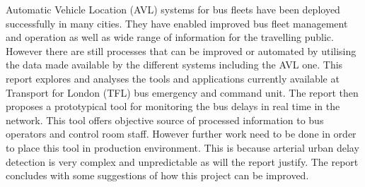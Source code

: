 Automatic Vehicle Location (AVL) systems for bus fleets have been deployed successfully in many cities. They have enabled improved bus fleet management and operation as well as wide range of information for the travelling public. However there are still processes that can be improved or automated by utilising the data made available by the different systems including the AVL one. This report explores and analyses the tools and applications currently available at Transport for London (TFL) bus emergency and command unit. The report then proposes a prototypical tool for monitoring the bus delays in real time in the network. This tool offers objective source of processed information to bus operators and control room staff. However further work need to be done in order to place this tool in production environment. This is because arterial urban delay detection is very complex and unpredictable as will the report justify. The report concludes with some suggestions of how this project can be improved.





